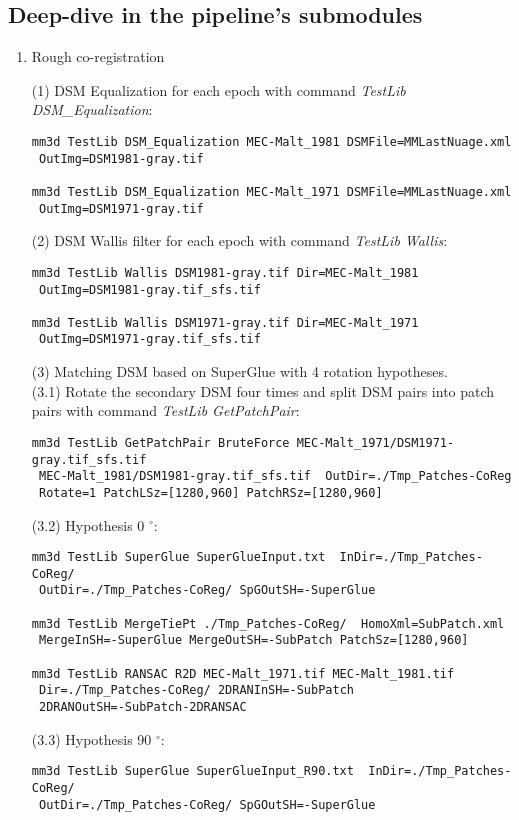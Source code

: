 \subsection{Deep-dive in the pipeline's submodules}
\begin{enumerate}

\item{Rough co-registration}
 
(1) \ac{DSM} Equalization for each epoch with command \textit{TestLib DSM\_Equalization}:\\
\begin{verbatim}
mm3d TestLib DSM_Equalization MEC-Malt_1981 DSMFile=MMLastNuage.xml
 OutImg=DSM1981-gray.tif
 
mm3d TestLib DSM_Equalization MEC-Malt_1971 DSMFile=MMLastNuage.xml
 OutImg=DSM1971-gray.tif
\end{verbatim}

(2) \ac{DSM} Wallis filter for each epoch with command \textit{TestLib Wallis}:\\
\begin{verbatim}
mm3d TestLib Wallis DSM1981-gray.tif Dir=MEC-Malt_1981
 OutImg=DSM1981-gray.tif_sfs.tif
 
mm3d TestLib Wallis DSM1971-gray.tif Dir=MEC-Malt_1971
 OutImg=DSM1971-gray.tif_sfs.tif
\end{verbatim}
(3) Matching \ac{DSM} based on SuperGlue with 4 rotation hypotheses.\\

 (3.1) Rotate the secondary \ac{DSM} four times and split \ac{DSM} pairs into patch pairs with command \textit{TestLib GetPatchPair}:\\
\begin{verbatim}
mm3d TestLib GetPatchPair BruteForce MEC-Malt_1971/DSM1971-gray.tif_sfs.tif 
 MEC-Malt_1981/DSM1981-gray.tif_sfs.tif  OutDir=./Tmp_Patches-CoReg
 Rotate=1 PatchLSz=[1280,960] PatchRSz=[1280,960]
\end{verbatim}
 (3.2) Hypothesis 0 $^\circ$:\\
\begin{verbatim}
mm3d TestLib SuperGlue SuperGlueInput.txt  InDir=./Tmp_Patches-CoReg/ 
 OutDir=./Tmp_Patches-CoReg/ SpGOutSH=-SuperGlue

mm3d TestLib MergeTiePt ./Tmp_Patches-CoReg/  HomoXml=SubPatch.xml 
 MergeInSH=-SuperGlue MergeOutSH=-SubPatch PatchSz=[1280,960]

mm3d TestLib RANSAC R2D MEC-Malt_1971.tif MEC-Malt_1981.tif
 Dir=./Tmp_Patches-CoReg/ 2DRANInSH=-SubPatch
 2DRANOutSH=-SubPatch-2DRANSAC
\end{verbatim}
 (3.3) Hypothesis 90 $^\circ$:\\
\begin{verbatim}
mm3d TestLib SuperGlue SuperGlueInput_R90.txt  InDir=./Tmp_Patches-CoReg/ 
 OutDir=./Tmp_Patches-CoReg/ SpGOutSH=-SuperGlue


\end{verbatim}
\end{enumerate}
